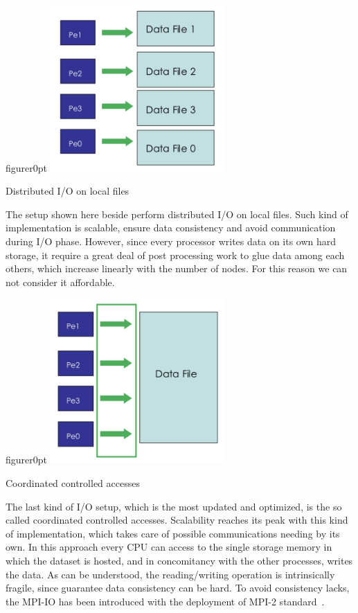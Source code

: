 \begin{wrapfloat}{figure}{r}{0pt}
\includegraphics[width=0.5\textwidth]{grafici/localio}
\caption{Distributed I/O on local files}
\end{wrapfloat}
\par
The setup shown here beside perform distributed I/O on local files. Such kind of implementation is scalable, ensure data consistency and avoid communication during I/O phase. However, since every processor writes data on its own hard storage, it require a great deal of post processing work to glue data among each others, which increase linearly with the number of nodes. For this reason we can not consider it affordable. \\

\begin{wrapfloat}{figure}{r}{0pt}
\includegraphics[width=0.5\textwidth]{grafici/mpiio}
\caption{Coordinated controlled accesses}
\end{wrapfloat}
\par
The last kind of I/O setup, which is the most updated and optimized, is the so called coordinated controlled accesses.
Scalability reaches its peak with this kind of implementation, which takes care of possible communications needing by its own.
In this approach every CPU can access to the single storage memory in which the dataset is hosted, and in concomitancy with the other processes, writes the data. As can be understood, the reading/writing operation is intrinsically fragile, since guarantee data consistency can be hard. To avoid consistency lacks, the MPI-IO has been introduced with the deployment of MPI-2 standard~\cite{MPI:standard2}.


